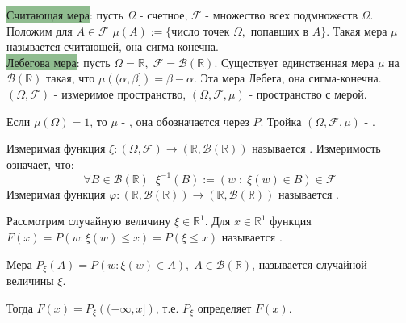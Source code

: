 \colorbox{DarkSeaGreen}{Считающая мера}: пусть $\Omega$ - счетное, $\mathcal{F}$ - множество всех подмножеств $\Omega$. Положим для $A \in \mathcal{F}$
$\displaystyle \mu(A) := \{ \text{число точек } \Omega, \text{ попавших в } A \}$. Такая мера $\mu$ называется считающей, она сигма-конечна.\\

\colorbox{DarkSeaGreen}{Лебегова мера}: пусть $\Omega = \mathbb{R}, \; \mathcal{F} = \mathcal{B}(\mathbb{R})$. Существует единственная мера $\mu$ на $\mathcal{B}(\mathbb{R})$ такая, что $\displaystyle \mu\left( (\alpha, \beta] \right) = \beta - \alpha$. Эта мера Лебега, она сигма-конечна.\\

\vspace{0.5cm}
$(\Omega, \mathcal{F})$ - измеримое пространство, $(\Omega, \mathcal{F}, \mu)$ - пространство с мерой.

\begin{definition}\label{cha:1/def:4}
	Если $\mu(\Omega) = 1$, то $\mu$ - , она обозначается через $P$. Тройка $(\Omega, \mathcal{F}, \mu)$ - .
\end{definition}

\begin{definition}\label{cha:1/def:5}
	Измеримая функция $\xi: (\Omega, \mathcal{F}) \to (\mathbb{R}, \mathcal{B}(\mathbb{R}))$ называется . Измеримость означает, что:
	$$\forall B \in \mathcal{B}(\mathbb{R}) \;\; \xi^{-1}(B) := (w \; : \; \xi(w) \in B) \in \mathcal{F}$$ Измеримая функция $\varphi: (\mathbb{R}, \mathcal{B}(\mathbb{R})) \to (\mathbb{R}, \mathcal{B}(\mathbb{R}))$ называется .
\end{definition}

\begin{definition}\label{cha:1/def:6}
	Рассмотрим случайную величину $\xi \in \mathbb{R}^1$. Для $x \in \mathbb{R}^1$ функция $F(x) = P(w: \xi(w) \le x) = P(\xi \le x)$ называется .
\end{definition}

\begin{definition}\label{cha:1/def:7}
	Мера $P_{\xi} (A) = P(w: \xi(w) \in A), \; A \in \mathcal{B}(\mathbb{R})$, называется  случайной величины $\xi$.
\end{definition}

Тогда $F(x) = P_{\xi} \left( (-\infty, x] \right)$, т.е. $P_{\xi}$ определяет $F(x)$. 

